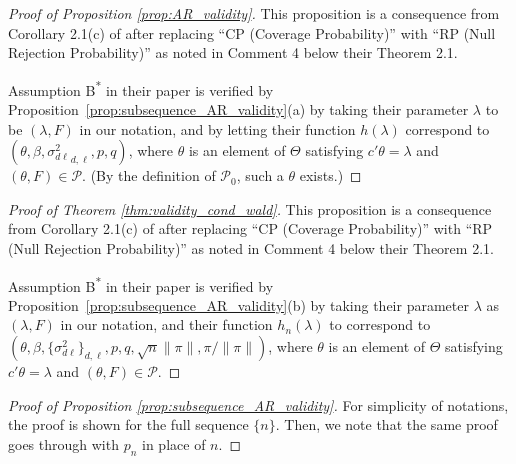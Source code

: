\documentclass[11pt]{article}
\theoremstyle{definition}
\newcommand{\0}{\ensuremath{\mathbf{0}}}
\begin{document}
\begin{bibunit}
\bigskip

%
\begin{proof}[Proof of Proposition \ref{prop:AR_validity}]
This proposition is a consequence from Corollary 2.1(c) of \citet{andrews/cheng/guggenberger:2020} after replacing “CP (Coverage Probability)” with “RP (Null Rejection Probability)” as noted in Comment 4 below their Theorem 2.1.

Assumption B\textsuperscript{*} in their paper is verified by Proposition~\ref{prop:subsequence_AR_validity}(a) by taking their parameter $\lambda$ to be $(\lambda, F)$ in our notation, and by letting their function $h(\lambda)$ correspond to $(\theta, \beta, {\sigma^2_{d\ell}}_{d,\ell}, p, q)$, where $\theta$ is an element of $\Theta$ satisfying $c'\theta = \lambda$ and $(\theta, F) \in \mathcal{P}$. (By the definition of $\mathcal{P}_0$, such a $\theta$ exists.)
\end{proof}
%

%
%
%
%
%
%
%
%
%
%
%
%
%
%
%
%
%
%
%
%
%
%
%
%
%
%
%
%
%
%

\bigskip

%
\begin{proof}[Proof of Theorem \ref{thm:validity_cond_wald}]
This proposition is a consequence from Corollary 2.1(c) of \citet{andrews/cheng/guggenberger:2020} after replacing “CP (Coverage Probability)” with “RP (Null Rejection Probability)” as noted in Comment 4 below their Theorem 2.1.

Assumption B\textsuperscript{*} in their paper is verified by Proposition~\ref{prop:subsequence_AR_validity}(b) 
by taking their parameter $\lambda$ as $(\lambda, F)$ in our notation, 
and their function $h_n(\lambda)$ to correspond to $(\theta, \beta, \{\sigma^2_{d\ell}\}_{d,\ell}, p, q, \sqrt{n}\|\pi\|, \pi/\|\pi\|)$, 
where $\theta$ is an element of $\Theta$ satisfying $c'\theta = \lambda$ and $(\theta, F) \in \mathcal{P}$.
\end{proof}


\bigskip


%
\begin{proof}[Proof of Proposition \ref{prop:subsequence_AR_validity}]
For simplicity of notations, the proof is shown for the full sequence $\{n\}$. Then, we note that the same proof goes through with $p_n$ in place of $n$.


\end{proof}
\end{bibunit}
\end{document}
